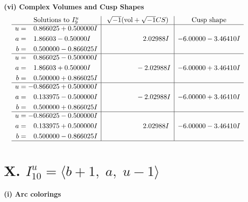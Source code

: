 \documentclass[1p]{elsarticle_modified}
\theoremstyle{definition}
\newcommand{\I}{\sqrt{-1}}
\begin{document}
\newpage\flushleft \textbf{(vi) Complex Volumes and Cusp Shapes}
$$\begin{array}{c|c|c}  
\text{Solutions to }I^u_{9}& \I (\text{vol} + \sqrt{-1}CS) & \text{Cusp shape}\\
 \hline 
\begin{aligned}
u &= \phantom{-}0.866025 + 0.500000 I \\
a &= \phantom{-}1.86603 - 0.50000 I \\
b &= \phantom{-}0.500000 - 0.866025 I\end{aligned}
 & \phantom{-0.000000 -}2.02988 I & -6.00000 - 3.46410 I \\ \hline\begin{aligned}
u &= \phantom{-}0.866025 - 0.500000 I \\
a &= \phantom{-}1.86603 + 0.50000 I \\
b &= \phantom{-}0.500000 + 0.866025 I\end{aligned}
 & \phantom{-0.000000 } -2.02988 I & -6.00000 + 3.46410 I \\ \hline\begin{aligned}
u &= -0.866025 + 0.500000 I \\
a &= \phantom{-}0.133975 - 0.500000 I \\
b &= \phantom{-}0.500000 + 0.866025 I\end{aligned}
 & \phantom{-0.000000 } -2.02988 I & -6.00000 + 3.46410 I \\ \hline\begin{aligned}
u &= -0.866025 - 0.500000 I \\
a &= \phantom{-}0.133975 + 0.500000 I \\
b &= \phantom{-}0.500000 - 0.866025 I\end{aligned}
 & \phantom{-0.000000 -}2.02988 I & -6.00000 - 3.46410 I\\
 \hline 
 \end{array}$$\newpage\newpage\renewcommand{\arraystretch}{1}
\centering \section*{X. $I^u_{10}= \langle b+1,\;a,\;u-1 \rangle$}
\flushleft \textbf{(i) Arc colorings}\\
\end{document}
